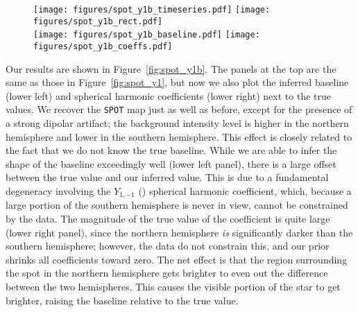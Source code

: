 \documentclass[modern]{aastex62}
\begin{document}
\begin{figure}[p!]
    \begin{centering}
    \texttt{[image: figures/spot\_y1b\_timeseries.pdf]}
    \texttt{[image: figures/spot\_y1b\_rect.pdf]}
    \\[0.5em]
    \texttt{[image: figures/spot\_y1b\_baseline.pdf]}
    \texttt{[image: figures/spot\_y1b\_coeffs.pdf]}
    \end{centering}
\end{figure}

Our results are shown in 
Figure~\ref{fig:spot_y1b}. The panels at the top are the same as those
in Figure~\ref{fig:spot_y1}, but now we also plot the inferred baseline
(lower left) and spherical harmonic coefficients (lower right) next to
the true values. We recover the \texttt{SPOT} map just as well as before,
except for the presence of a strong dipolar artifact; the background
intensity level is higher in the northern hemisphere and lower in the
southern hemisphere. This effect is closely related to the fact that
we do not know the true baseline. While we are able to infer the
shape of the baseline exceedingly well (lower left panel), there is a large
offset between the true value and our inferred value. This is due to
a fundamental degeneracy involving the 
$Y_{1,-1}$ ()
spherical harmonic coefficient, which, because a large portion of the southern
hemisphere is never in view, cannot be constrained by the data. The 
magnitude of the true value of the coefficient is quite large (lower right
panel), since the northern hemisphere \emph{is} significantly darker than
the southern hemisphere; however, the data do not constrain this, and 
our prior shrinks all coefficients toward zero. The net effect is that the
region surrounding the spot in the northern hemisphere gets brighter to 
even out the difference between the two hemispheres. This causes the 
visible portion of the star to get brighter, raising the baseline
relative to the true value.
\end{document}
